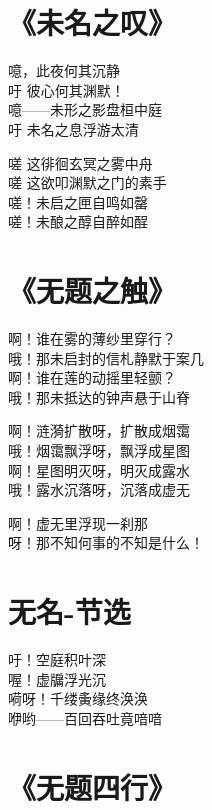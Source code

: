 \clearpage


\section{《未名之叹》}

噫，此夜何其沉静 \\
吁 彼心何其渊默！ \\
噫——未形之影盘桓中庭 \\
吁 未名之息浮游太清
\vspace{1em}

嗟 这徘徊玄冥之雾中舟 \\
嗟 这欲叩渊默之门的素手 \\
嗟！未启之匣自鸣如罄 \\
嗟！未酿之醇自醉如酲

\clearpage


\section{《无题之触》}

啊！谁在雾的薄纱里穿行？ \\
哦！那未启封的信札静默于案几 \\
啊！谁在莲的动摇里轻颤？ \\
哦！那未抵达的钟声悬于山脊
\vspace{1em}

啊！涟漪扩散呀，扩散成烟霭 \\
哦！烟霭飘浮呀，飘浮成星图 \\
啊！星图明灭呀，明灭成露水 \\
哦！露水沉落呀，沉落成虚无
\vspace{1em}

啊！虚无里浮现一刹那 \\
呀！那不知何事的不知是什么！

\clearpage


\section{无名-节选}

吁！空庭积叶深 \\
喔！虚牖浮光沉 \\
嗬呀！千缕夤缘终涣涣 \\
咿哟——百回吞吐竟喑喑

\clearpage


\section{《无题四行》}

